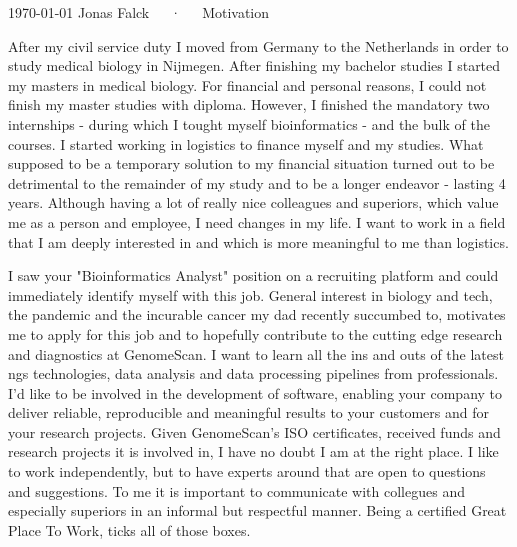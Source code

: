\documentclass[11pt, a4paper]{awesome-cv}
\begin{document}
\makecvheader[R]

\makecvfooter
  {\today}
  {Jonas Falck~~~·~~~Motivation}
  {}

\makelettertitle

\begin{cvletter}

After my civil service duty I moved from Germany to the Netherlands in order to study medical biology in Nijmegen. After finishing my bachelor studies I started my masters in medical biology.
For financial and personal reasons, I could not finish my master studies with diploma.
However, I finished the mandatory two internships - during which I tought myself bioinformatics - and the bulk of the courses.
I started working in logistics to finance myself and my studies.
What supposed to be a temporary solution to my financial situation turned out to be detrimental to the remainder of my study and to be a longer endeavor - lasting 4 years.
Although having a lot of really nice colleagues and superiors, which value me as a person and employee, I need changes in my life.
I want to work in a field that I am deeply interested in and which is more meaningful to me than logistics.

I saw your "Bioinformatics Analyst" position on a recruiting platform and could immediately identify myself with this job. 
General interest in biology and tech, the pandemic and the incurable cancer my dad recently succumbed to, motivates me to apply for this job and to hopefully contribute to the cutting edge research and diagnostics at GenomeScan.
I want to learn all the ins and outs of the latest ngs technologies, data analysis and data processing pipelines from professionals. 
I'd like to be involved in the development of software, enabling your company to deliver reliable, reproducible and meaningful results to your customers and for your research projects.
Given GenomeScan's ISO certificates, received funds and research projects it is involved in, I have no doubt I am at the right place.
I like to work independently, but to have experts around that are open to questions and suggestions.
To me it is important to communicate with collegues and especially superiors in an informal but respectful manner.
Being a certified Great Place To Work, ticks all of those boxes. 



\end{cvletter}
\end{document}
